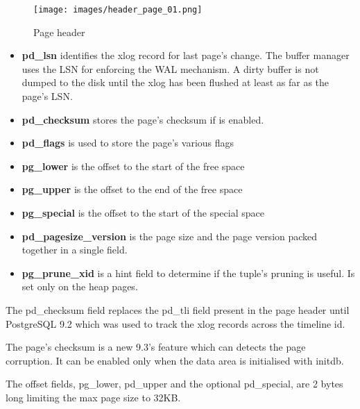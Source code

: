 \begin{figure}[H]
    \begin{center}

        \texttt{[image: images/header\_page\_01.png]}

        \caption{Page header}
        \label{fig:HEADERPAG01}
    \end{center}

\end{figure}
\begin{itemize}
    \item \textbf{pd\_lsn} identifies the xlog record for last page's change.  The
        buffer manager uses the  LSN for enforcing the WAL mechanism. A dirty buffer is not
        dumped to the disk until the xlog has been flushed at least as far as the page's LSN.
    \item \textbf{pd\_checksum} stores the page's checksum if is enabled.
    \item \textbf{pd\_flags} is used to store the page's various flags
    \item \textbf{pg\_lower} is the offset to the start of the free space
    \item \textbf{pg\_upper} is the offset to the end of the free space
    \item \textbf{pg\_special} is the offset to the start of the special space
    \item \textbf{pd\_pagesize\_version} is the page size and the page version packed
        together in a single field.
    \item \textbf{pg\_prune\_xid} is a hint field to determine if the tuple's pruning is
        useful. Is set only on the heap pages.

\end{itemize}

The pd\_checksum field replaces the pd\_tli field present in the page
header until PostgreSQL 9.2 which was used to track the xlog records across the timeline id.
\newline

The page's checksum is a new 9.3's feature which can detects the page corruption. It can be enabled only
when the data area is initialised with initdb.\newline

The offset fields, pg\_lower, pd\_upper and the optional pd\_special, are 2 bytes long limiting the
max page size to 32KB.\newline

